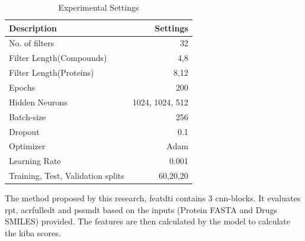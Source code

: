 \begin{table} [H]
    \centering
    \caption{Experimental Settings} 
    \label{table:experiment}
    \begin{tabular}{|l|r|}
    \hline
    
    \textbf{Description} & \textbf{Settings} \\ \hline
    No. of filters & 32 \\ \hline
    Filter Length(Compounds) & 4,8 \\ \hline
    Filter Length(Proteins) & 8,12 \\ \hline
    Epochs & 200 \\ \hline
    Hidden Neurons & 1024, 1024, 512 \\ \hline
    Batch-size & 256 \\ \hline
    Dropout & 0.1 \\ \hline
    Optimizer & Adam \\ \hline
    Learning Rate & 0.001 \\ \hline
    Training, Test, Validation splits & 60,20,20 \\ \hline
    
    \end{tabular}
    \end{table}

The method proposed by this research, \acrfull{featdti} contains 3 \acrfull{cnn}-blocks. It evaluates \acrfull{rpt}, acrfull{edt} and \acrfull{pssmdt} based on the inputs (Protein FASTA and Drugs SMILES) provided. The features are then calculated by the model to calculate the \acrfull{kiba} scores.


